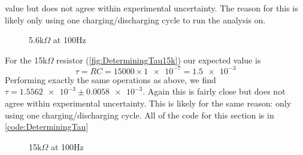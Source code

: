 \documentclass[12pt]{article}
\numberwithin{equation}{section}
\numberwithin{figure}{section}
\begin{document}
    value but does not agree within experimental uncertainty. The reason for this is likely only using 
    one charging/discharging cycle to run the analysis on. 
    \begin{figure}[H]%
        \centering
        \qquad
        \caption{5.6k$\Omega$ at 100Hz}
        \label{fig:DeterminingTau5k6}
    \end{figure}\noindent
    For the 15k$\Omega$ resistor (\autoref{fig:DeterminingTau15k}) our expected value is 
    \begin{equation*}
        \tau=RC=15000\times\num{1e-7}=\num{1.5e-3}
    \end{equation*}
    Performing exactly the same operations as above, we find $\tau=\num{1.5562e-3}\pm\num{0.0058e-3}$. Again 
    this is fairly close but does not agree within experimental uncertainty. This is likely for the same reason: 
    only using one charging/discharging cycle. All of the code for this section is in \autoref{code:DeterminingTau}
    \begin{figure}[H]%
        \centering
        \qquad
        \caption{15k$\Omega$ at 100Hz}
        \label{fig:DeterminingTau15k}
    \end{figure}
\end{document}
